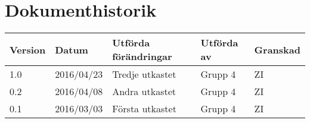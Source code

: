 \documentclass[11pt]{article}
\begin{document}
\tableofcontents

\pagebreak
\section*{Dokumenthistorik}
\begin{table}[h]
\begin{tabular}{|l|l|l|l|l|} \hline

\textbf{Version} & \textbf{Datum} & \textbf{Utförda förändringar} & \textbf{Utförda av} & \textbf{Granskad} \\ \hline
1.0 & 2016/04/23 & Tredje utkastet & Grupp 4 & ZI \\ \hline
0.2 & 2016/04/08 & Andra utkastet & Grupp 4 & ZI \\ \hline
0.1 & 2016/03/03 & Första utkastet & Grupp 4 & ZI \\ \hline

\end{tabular}
\end{table}

\pagebreak
{}
\end{document}
